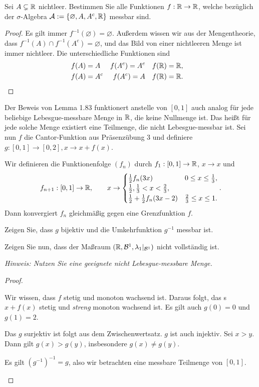 \begin{Problem}
	Sei $A\subsetneq \mathbb{R}$ nichtleer. Bestimmen Sie alle Funktionen $f:\mathbb{R}\to \mathbb{R}$, welche bezüglich der $\sigma$-Algebra $\mathcal{A}:=\left\{ \varnothing, A,A^c, \mathbb{R} \right\} $ messbar sind.
\end{Problem}
\begin{proof}
	Es gilt immer $f^{-1}(\varnothing)=\varnothing$. Außerdem wissen wir aus der Mengentheorie, dass $f^{-1}(A)\cap f^{-1}(A^c)=\varnothing$, und das Bild von einer nichtleeren Menge ist immer nichtleer. Die unterschiedliche Funktionen sind
	\begin{align*}
		& f(A)=A & f(A^c)=A^c & & f(\mathbb{R})=\mathbb{R}, \\
		& f(A)=A^c & f(A^c)=A & & f(\mathbb{R})=\mathbb{R}. & \qedhere
	\end{align*}
\end{proof}
\begin{Problem}
	Der Beweis von Lemma 1.83 funktionert anstelle von $[0,1]$ auch analog f\"{u}r jede beliebige Lebesgue-messbare Menge in $\mathbb{R}$, die keine Nullmenge ist. Das heißt f\"{u}r jede solche Menge existiert eine Teilmenge, die nicht Lebesgue-messbar ist.
	Sei nun $f$ die Cantor-Funktion aus Präsenzübung 3 und definiere $g:[0,1]\to [0,2],x\to x+f(x)$.
	\begin{tcolorbox}
		Wir definieren die Funktionenfolge $(f_n)$ durch $f_1:[0,1]\to \mathbb{R}$, $x\to x$ und
		\[
			f_{n+1}:[0,1]\to \mathbb{R},\qquad x\to \begin{cases}
				\frac{1}{2}f_n(3x) & 0 \le x \le \frac{1}{3},\\
				\frac{1}{2}, \frac{1}{3}<x<\frac{2}{3},\\
				\frac{1}{2}+\frac{1}{2}f_n(3x-2) & \frac{2}{3}\le x \le 1.
			\end{cases}
		.\] 
		Dann konvergiert $f_n$ gleichmäßig gegen eine Grenzfunktion $f$.
	\end{tcolorbox}
	\begin{parts}
		\item Zeigen Sie, dass $g$ bijektiv und die Umkehrfunktion $g^{-1}$ messbar ist.
		\item Zeigen Sie nun, dass der Maßraum $(\mathbb{R}, \mathcal{B}^1, \lambda_1|_{\mathcal{B}^1})$ nicht vollständig ist.
			
			{\footnotesize \emph{Hinweis: Nutzen Sie eine geeignete nicht Lebesgue-messbare Menge.}}
	\end{parts}
\end{Problem}
\begin{proof}
	\begin{parts}
	\item Wir wissen, dass $f$ stetig und monoton wachsend ist.  Daraus folgt, das s $x+f(x)$ stetig und \emph{streng} monoton wachsend ist. Es gilt auch $g(0)=0$ und $g(1)=2$. 

		Das $g$ surjektiv ist folgt aus dem Zwischenwertsatz. $g$ ist auch injektiv. Sei $x>y$. Dann gilt $g(x)>g(y)$, insbesondere $g(x)\neq g(y)$.

		Es gilt $(g^{-1})^{-1}=g$, also wir betrachten eine messbare Teilmenge von $[0,1]$.  
	\end{parts}
\end{proof}
